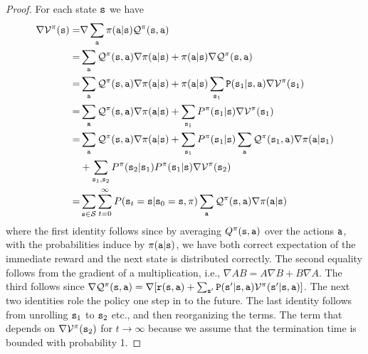 \begin{proof}
For each state ${\tt s}$ we have
\begin{align*}
\nabla \mathcal{V}^\pi({\tt s}) =& \nabla \sum_{\tt a} \pi({\tt a}|{\tt s}) \mathcal{Q}^\pi({\tt s},{\tt a})\\
=&\sum_{\tt a}  \mathcal{Q}^\pi({\tt s},{\tt a}) \nabla \pi({\tt a}|{\tt s}) + \pi({\tt a}|{\tt s}) \nabla \mathcal{Q}^\pi({\tt s},{\tt a})\\
=&\sum_{\tt a}  \mathcal{Q}^\pi({\tt s},{\tt a}) \nabla \pi({\tt a}|{\tt s}) + \pi({\tt a}|{\tt s}) \sum_{{\tt s}_1} {\tt P}({\tt s}_1|{\tt s},{\tt a}) \nabla \mathcal{V}^\pi({\tt s}_1)\\
=& \sum_{\tt a}  \mathcal{Q}^\pi({\tt s},{\tt a}) \nabla
\pi({\tt a}|{\tt s}) + \sum_{{\tt s}_1} P^{\pi}({\tt s}_1|{\tt s})
\nabla \mathcal{V}^\pi({\tt s}_1)\\
=& \sum_{\tt a}  \mathcal{Q}^\pi({\tt s},{\tt a}) \nabla
\pi({\tt a}|{\tt s}) + \sum_{{\tt s}_1} P^{\pi}({\tt s}_1|{\tt s})
\sum_{\tt a} \mathcal{Q}^\pi({\tt s}_1,{\tt a}) \nabla
\pi({\tt a}|{\tt s}_1) \\
& + \sum_{{\tt s}_1, {\tt s}_2}
P^{\pi}({\tt s}_2|{\tt s}_1)P^{\pi}({\tt s}_1|{\tt s})
\nabla \mathcal{V}^\pi({\tt s}_2)\\
=& \sum_{{\tt s}\in
\mathcal{S}}\sum_{t=0}^\infty P({\tt s}_t = {\tt s} | {\tt s}_0 = {\tt s}, \pi) \sum_{\tt a}
\mathcal{Q}^\pi({\tt s},{\tt a})\nabla\pi({\tt a}|{\tt s})
\end{align*}
where the first identity follows since by averaging $Q^\pi({\tt s},{\tt a})$ over the actions ${\tt a}$, with the
probabilities induce by $\pi({\tt a}|{\tt s})$, we have both correct expectation of the immediate reward and the next state is distributed correctly. The second equality follows from the gradient of a multiplication, i.e., $\nabla AB=A\nabla B+B\nabla A$. The third follows since 
$\nabla \mathcal{Q}^\pi({\tt s},{\tt a})= \nabla
[{\tt r}({\tt s},{\tt a})+
\sum_{{\tt s}'}{\tt P}({\tt s}'|{\tt s},{\tt a})\mathcal{V}^\pi({\tt s}'|{\tt s},{\tt a})]$.
%
The next two identities role the policy one step in to the future.
%
The last identity follows from unrolling ${\tt s}_1$ to ${\tt s}_2$ etc., and then reorganizing the terms. The term that depends on $\nabla \mathcal{V}^\pi({\tt s}_2)$ for $t\to\infty$ because we assume that the termination time is bounded with probability 1.


\end{proof}
